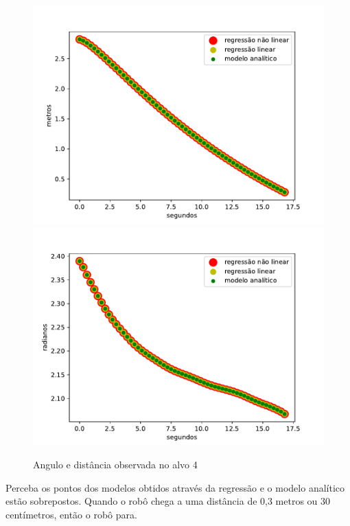 \begin{figure}[H]
    \centering
    \includegraphics[scale=0.45]{figuras/distance_over_time_4.pdf}
    \includegraphics[scale=0.45]{figuras/angle_over_time_4.pdf}
    \caption{Angulo e distância observada no alvo 4}
\end{figure}

Perceba os pontos dos modelos obtidos através da regressão e o modelo analítico
estão sobrepostos. Quando o robô chega a uma distância de 0,3 metros ou 30 centímetros,
então o robô para.

